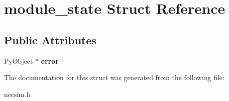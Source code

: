 \hypertarget{structmodule__state}{}\section{module\+\_\+state Struct Reference}
\label{structmodule__state}
\subsection*{Public Attributes}
\begin{DoxyCompactItemize}
\item 
Py\+Object $\ast$ {\bfseries error}\hypertarget{structmodule__state_ae7c076709e128f5d18a6939bd4f0a320}{}\label{structmodule__state_ae7c076709e128f5d18a6939bd4f0a320}

\end{DoxyCompactItemize}


The documentation for this struct was generated from the following file\+:\begin{DoxyCompactItemize}
\item 
necsim.\+h\end{DoxyCompactItemize}
